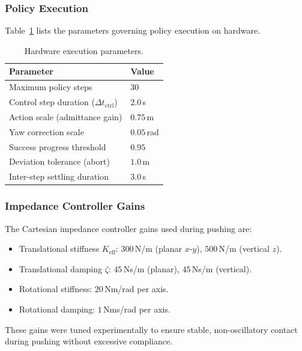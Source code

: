 \subsubsection{Policy Execution}

Table~\ref{tab:exec_params} lists the parameters governing policy execution on hardware.

\begin{table}[h]
\centering
\caption{Hardware execution parameters.}
\label{tab:exec_params}
\begin{tabular}{ll}
\toprule
\textbf{Parameter}                  & \textbf{Value}         \\
\midrule
Maximum policy steps                & $30$                   \\
Control step duration ($\Delta t_{\mathrm{ctrl}}$) & $2.0$\,s \\
Action scale (admittance gain)      & $0.75$\,m              \\
Yaw correction scale                & $0.05$\,rad            \\
Success progress threshold          & $0.95$                 \\
Deviation tolerance (abort)         & $1.0$\,m               \\
Inter-step settling duration        & $3.0$\,s               \\
\bottomrule
\end{tabular}
\end{table}

\subsubsection{Impedance Controller Gains}

The Cartesian impedance controller gains used during pushing are:
\begin{itemize}
    \item Translational stiffness $K_{\mathrm{eff}}$: $300$\,N/m (planar $x$-$y$), $500$\,N/m (vertical $z$).
    \item Translational damping $\zeta$: $45$\,Ns/m (planar), $45$\,Ns/m (vertical).
    \item Rotational stiffness: $20$\,Nm/rad per axis.
    \item Rotational damping: $1$\,Nms/rad per axis.
\end{itemize}

These gains were tuned experimentally to ensure stable, non-oscillatory contact during pushing without excessive compliance.

